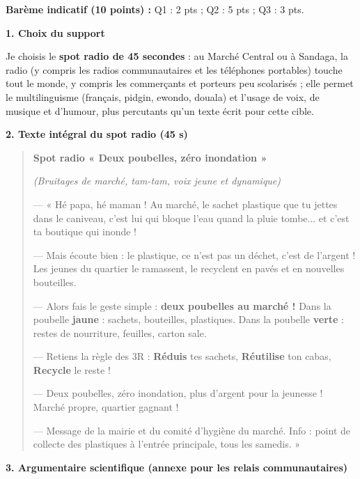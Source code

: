 \documentclass[11pt]{article}
\begin{document}
\begin{corrige}
\textbf{Barème indicatif (10 points) :} Q1 : 2 pts ; Q2 : 5 pts ; Q3 : 3 pts.

\textbf{1. Choix du support}

Je choisis le \textbf{spot radio de 45 secondes} : au Marché Central ou à Sandaga, la radio (y compris les radios communautaires et les téléphones portables) touche tout le monde, y compris les commerçants et porteurs peu scolarisés ; elle permet le multilinguisme (français, pidgin, ewondo, douala) et l'usage de voix, de musique et d'humour, plus percutants qu'un texte écrit pour cette cible.

\textbf{2. Texte intégral du spot radio (45 s)}

\begin{quote}
\textbf{Spot radio « Deux poubelles, zéro inondation »}

\emph{(Bruitages de marché, tam-tam, voix jeune et dynamique)}

— « Hé papa, hé maman ! Au marché, le sachet plastique que tu jettes dans le caniveau, c'est lui qui bloque l'eau quand la pluie tombe... et c'est ta boutique qui inonde !

— Mais écoute bien : le plastique, ce n'est pas un déchet, c'est de l'argent ! Les jeunes du quartier le ramassent, le recyclent en pavés et en nouvelles bouteilles.

— Alors fais le geste simple : \textbf{deux poubelles au marché !} Dans la poubelle \textbf{jaune} : sachets, bouteilles, plastiques. Dans la poubelle \textbf{verte} : restes de nourriture, feuilles, carton sale.

— Retiens la règle des 3R : \textbf{Réduis} tes sachets, \textbf{Réutilise} ton cabas, \textbf{Recycle} le reste !

— Deux poubelles, zéro inondation, plus d'argent pour la jeunesse ! Marché propre, quartier gagnant !

— Message de la mairie et du comité d'hygiène du marché. Info : point de collecte des plastiques à l'entrée principale, tous les samedis. »
\end{quote}

\textbf{3. Argumentaire scientifique (annexe pour les relais communautaires)}


\end{corrige}
\end{document}
